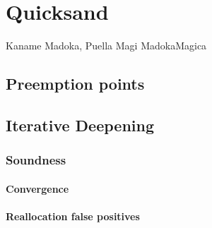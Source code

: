 \chapter{Quicksand}
\label{chap:quicksand}
{Kaname Madoka, Puella Magi Madoka{\raisebox{0.1em}{$\scriptstyle \bigstar$}}Magica}



\section{Preemption points} %
\label{sec:quicksand-pps}


\section{Iterative Deepening}
\label{sec:quicksand-id}

\subsection{Soundness}
\label{sec:quicksand-soundness}

\subsubsection{Convergence}

\subsubsection{Reallocation false positives}
\label{sec:quicksand-realloc}


